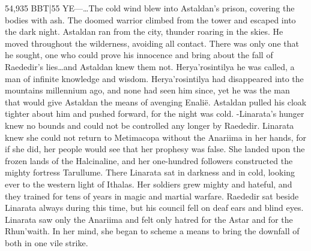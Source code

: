 \documentclass[smalldemyvopaper,11pt,twoside,onecolumn,openright,extrafontsizes]{memoir}
\begin{document}
{{54,935 BBT|55 YE—…The cold wind blew into Astaldan’s prison, covering the bodies with ash. The doomed warrior climbed from the tower and escaped into the dark night. Astaldan ran from the city, thunder roaring in the skies. He moved throughout the wilderness, avoiding all contact. There was only one that he sought, one who could prove his innocence and bring about the fall of Raededir’s lies…and Astaldan knew them not. Herya’rosintilya he was called, a man of infinite knowledge and wisdom. Herya’rosintilya had disappeared into the mountains millennium ago, and none had seen him since, yet he was the man that would give Astaldan the means of avenging Enalië. Astaldan pulled his cloak tighter about him and pushed forward, for the night was cold.
-Linarata’s hunger knew no bounds and could not be controlled any longer by Raededir. Linarata knew she could not return to Metimacopa without the Anariima in her hands, for if she did, her people would see that her prophesy was false. She landed upon the frozen lands of the Halcinaline, and her one-hundred followers constructed the mighty fortress Tarullume. There Linarata sat in darkness and in cold, looking ever to the western light of Ithalas. Her soldiers grew mighty and hateful, and they trained for tens of years in magic and martial warfare. Raededir sat beside Linarata always during this time, but his council fell on deaf ears and blind eyes. Linarata saw only the Anariima and felt only hatred for the Astar and for the Rhun’waith. In her mind, she began to scheme a means to bring the downfall of both in one vile strike.

}}
\end{document}
